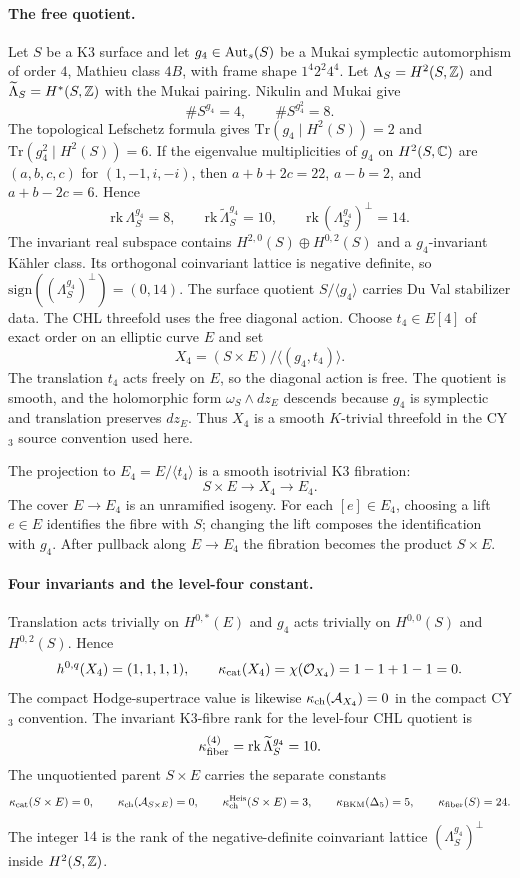 \paragraph{The free quotient.}
Let $S$ be a K3 surface and let
$g_4 \in \mathrm{Aut}_s(S)$ be a Mukai symplectic automorphism of order $4$,
Mathieu class $4B$, with frame shape $1^{4}2^{2}4^{4}$.  Let
$\Lambda_S=H^2(S,\mathbb{Z})$ and
$\widetilde\Lambda_S=H^*(S,\mathbb{Z})$ with the Mukai pairing.  Nikulin and
Mukai give
\[
  \#S^{g_4}=4,\qquad
  \#S^{g_4^2}=8 .
\]
The topological Lefschetz formula gives
$\mathrm{Tr}(g_4\mid H^2(S))=2$ and
$\mathrm{Tr}(g_4^2\mid H^2(S))=6$.  If the eigenvalue multiplicities
of $g_4$ on $H^2(S,\mathbb{C})$ are
$(a,b,c,c)$ for $(1,-1,i,-i)$, then
$a+b+2c=22$, $a-b=2$, and $a+b-2c=6$.  Hence
\[
  \mathrm{rk}\,\Lambda_S^{g_4}=8,\qquad
  \mathrm{rk}\,\widetilde\Lambda_S^{g_4}=10,\qquad
  \mathrm{rk}\,(\Lambda_S^{g_4})^\perp=14 .
\]
The invariant real subspace contains $H^{2,0}(S)\oplus H^{0,2}(S)$
and a $g_4$-invariant K\"ahler class.  Its orthogonal coinvariant
lattice is negative definite, so
$\mathrm{sign}((\Lambda_S^{g_4})^\perp)=(0,14)$.
The surface quotient $S/\langle g_4\rangle$ carries Du Val stabilizer
data.  The CHL threefold uses the free diagonal action.  Choose
$t_4\in E[4]$ of exact order on an elliptic curve $E$ and set
\[
  X_4=(S\times E)/\langle(g_4,t_4)\rangle .
\]
The translation $t_4$ acts freely on $E$, so the diagonal action is free.
The quotient is smooth, and the holomorphic form
$\omega_S\wedge dz_E$ descends because $g_4$ is symplectic and
translation preserves $dz_E$.  Thus $X_4$ is a smooth $K$-trivial
threefold in the CY$_3$ source convention used here.

The projection to $E_4=E/\langle t_4\rangle$ is a smooth isotrivial
K3 fibration:
\[
  S\times E \longrightarrow X_4 \longrightarrow E_4 .
\]
The cover $E\to E_4$ is an unramified isogeny.  For each
$[e]\in E_4$, choosing a lift $e\in E$ identifies the fibre with $S$;
changing the lift composes the identification with $g_4$.  After
pullback along $E\to E_4$ the fibration becomes the product
$S\times E$.

\paragraph{Four invariants and the level-four constant.}
Translation acts trivially on $H^{0,*}(E)$ and $g_4$ acts trivially on
$H^{0,0}(S)$ and $H^{0,2}(S)$.  Hence
\[
  h^{0,q}(X_4)=(1,1,1,1),\qquad
  \kappa_{\mathrm{cat}}(X_4)=\chi(\mathcal{O}_{X_4})=1-1+1-1=0 .
\]
The compact Hodge-supertrace value is likewise
$\kappa_{\mathrm{ch}}(\mathcal{A}_{X_4})=0$ in the compact CY$_3$ convention.  The invariant
K3-fibre rank for the level-four CHL quotient is
\[
  \kappa_{\mathrm{fiber}}^{(4)}=\mathrm{rk}\,\widetilde\Lambda_S^{g_4}=10.
\]
The unquotiented parent $S\times E$ carries the separate constants
\[
  \kappa_{\mathrm{cat}}(S\times E)=0,\qquad
  \kappa_{\mathrm{ch}}(\mathcal{A}_{S\times E})=0,\qquad
  \kappa_{\mathrm{ch}}^{\mathrm{Heis}}(S\times E)=3,\qquad
  \kappa_{\mathrm{BKM}}(\Delta_5)=5,\qquad
  \kappa_{\mathrm{fiber}}(S)=24 .
\]
The integer $14$ is the rank of the negative-definite coinvariant
lattice $(\Lambda_S^{g_4})^\perp$ inside $H^2(S,\mathbb{Z})$.

